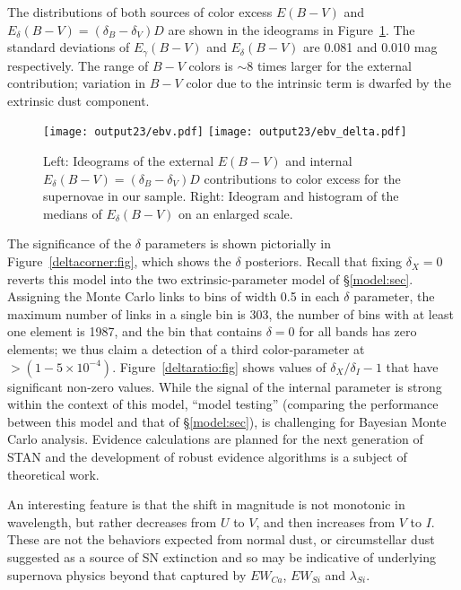\documentclass{aastex61}   	%
\begin{document}
The distributions of both sources of color excess $E(B-V)$ and
 $E_\delta(B-V) = (\delta_B-\delta_V)D$ are shown in the ideograms in Figure~\ref{ebv:fig}.
The standard deviations of $E_\gamma(B-V)$ and $E_\delta(B-V)$ are
0.081
and 0.010
mag respectively.
The range of $B-V$ colors is $\sim 8$ times larger for the external contribution; variation in $B-V$ color due to the intrinsic term is dwarfed by the extrinsic dust
component. 

\begin{figure}[htbp] %
   \centering
   \texttt{[image: output23/ebv.pdf]}
   \texttt{[image: output23/ebv\_delta.pdf]}
      \caption{Left: Ideograms of the external $E(B-V)$ and
   internal $E_\delta(B-V) = (\delta_B-\delta_V)D$  contributions to color excess  for the supernovae in our sample.
   Right: Ideogram and histogram of the medians of $E_\delta(B-V)$ on an enlarged scale.
   \label{ebv:fig}}
\end{figure}
The significance of the $\delta$ parameters is shown pictorially in
Figure~\ref{deltacorner:fig}, which shows the $\delta$ posteriors.
Recall that fixing $\delta_X=0$ reverts this model into the two extrinsic-parameter model of \S\ref{model:sec}.
Assigning the Monte Carlo links to bins of width 0.5 in each $\delta$ parameter, the maximum number of links in a single bin is 303, the number of bins
with at least one element is 1987, and the bin that contains $\delta=0$ for all bands has zero elements; we thus claim a detection
of a third color-parameter at $> (1-5\times 10^{-4})$.
Figure~\ref{deltaratio:fig} shows  values of $\delta_X/\delta_I-1$ that  have significant non-zero values.
While the signal of the internal parameter is strong within the context of this model, ``model testing'' (comparing the
performance  between this model
and that of \S\ref{model:sec}), is challenging for Bayesian Monte Carlo analysis.  Evidence calculations are planned
for the next generation of STAN and the development of robust evidence algorithms is a subject of theoretical work.

An interesting feature
is that the shift in magnitude is not monotonic in wavelength, but rather decreases from $U$ to $V$, and then increases from $V$
to $I$.
These are not the behaviors expected from normal dust, or
circumstellar dust suggested as a source of SN extinction \citep{2005ApJ...635L..33W,2008ApJ...686L.103G,
2015ApJ...807L..26G} and so may be indicative of underlying supernova physics beyond that captured by $EW_{Ca}$, $EW_{Si}$ and
$\lambda_{Si}$.
\end{document}
